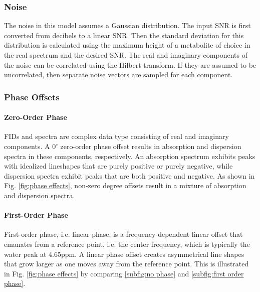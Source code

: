 % 
 
\subsubsection{Noise}
The noise in this model assumes a Gaussian distribution. The input SNR is first converted from decibels to a linear SNR. Then the standard deviation for this distribution is calculated using the maximum height of a metabolite of choice in the real spectrum and the desired SNR. The real and imaginary components of the noise can be correlated using the Hilbert transform. If they are assumed to be uncorrelated, then separate noise vectors are sampled for each component. 

\subsubsection{Phase Offsets}
\paragraph{Zero-Order Phase}
FIDs and spectra are complex data type consisting of real and imaginary components. A $0^{\circ}$ zero-order phase offset results in absorption and dispersion spectra in these components, respectively. An absorption spectrum exhibits peaks with idealized lineshapes that are purely positive or purely negative, while dispersion spectra exhibit peaks that are both positive and negative. As shown in Fig. \ref{fig:phase effects}, non-zero degree offsets result in a mixture of absorption and dispersion spectra. %
 
\paragraph{First-Order Phase}
First-order phase, i.e. linear phase, is a frequency-dependent linear offset that emanates from a reference point, i.e. the center frequency, which is typically the water peak at 4.65ppm. %
A linear phase offset creates asymmetrical line shapes that grow larger as one moves away from the reference point. This is illustrated in Fig. \ref{fig:phase effects} by comparing \ref{subfig:no phase} and \ref{subfig:first order phase}. %

